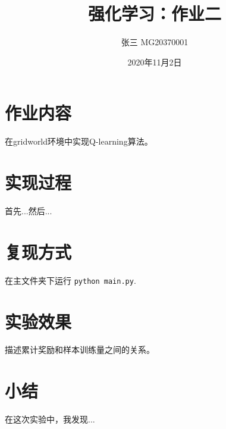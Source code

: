 \documentclass[a4paper,12pt]{article}
\begin{document}
\begin{CJK}{UTF8}{gbsn}

\title{强化学习：作业二}

\author{张三 MG20370001}

\date{2020年11月2日}

\maketitle

\section{作业内容}
在gridworld环境中实现Q-learning算法。

\section{实现过程}

首先...然后...

\section{复现方式}
在主文件夹下运行 \texttt{python main.py}.
\section{实验效果}
描述累计奖励和样本训练量之间的关系。
\section{小结}
在这次实验中，我发现...



\end{CJK}
\end{document}
